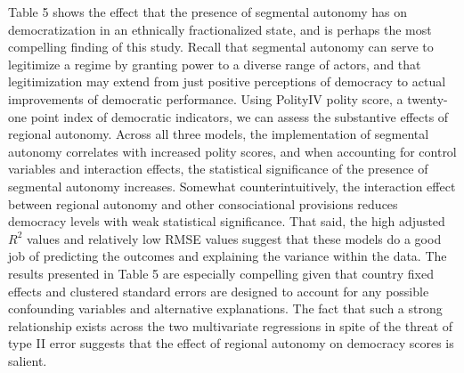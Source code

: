 \documentclass[12pt]{article}
\begin{document}
Table 5 shows the effect that the presence of segmental autonomy has on democratization in an ethnically fractionalized state, and is perhaps the most compelling finding of this study. Recall that segmental autonomy can serve to legitimize a regime by granting power to a diverse range of actors, and that legitimization may extend from just positive perceptions of democracy to actual improvements of democratic performance. Using PolityIV polity score, a twenty-one point index of democratic indicators, we can assess the substantive effects of regional autonomy. Across all three models, the implementation of segmental autonomy correlates with increased polity scores, and when accounting for control variables and interaction effects, the statistical significance of the presence of segmental autonomy increases. Somewhat counterintuitively, the interaction effect between regional autonomy and other consociational provisions reduces democracy levels with weak statistical significance. That said, the high adjusted $R^2$ values and relatively low RMSE values suggest that these models do a good job of predicting the outcomes and explaining the variance within the data. The results presented in Table 5 are especially compelling given that country fixed effects and clustered standard errors are designed to account for any possible confounding variables and alternative explanations. The fact that such a strong relationship exists across the two multivariate regressions in spite of the threat of type II error suggests that the effect of regional autonomy on democracy scores is salient.  
\end{document}
